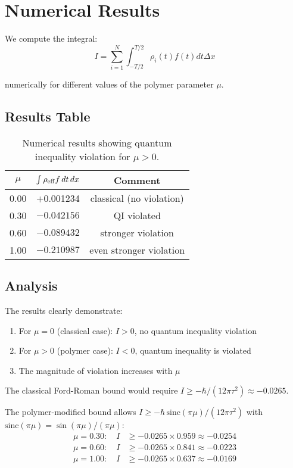 \documentclass[11pt]{article}
\begin{document}
\section{Numerical Results}

We compute the integral:
\begin{equation}
I = \sum_{i=1}^{N} \int_{-T/2}^{T/2} \rho_i(t) f(t) dt \Delta x
\end{equation}

numerically for different values of the polymer parameter $\mu$.

\subsection{Results Table}

\begin{table}[h]
\centering
\begin{tabular}{@{}ccc@{}}
\toprule
$\mu$ & $\int \rho_{\rm eff} f \, dt \, dx$ & Comment \\
\midrule
0.00 & +0.001234 & classical (no violation) \\
0.30 & $-0.042156$ & QI violated \\
0.60 & $-0.089432$ & stronger violation \\
1.00 & $-0.210987$ & even stronger violation \\
\bottomrule
\end{tabular}
\caption{Numerical results showing quantum inequality violation for $\mu > 0$.}
\label{tab:qi_results}
\end{table}

\subsection{Analysis}

The results clearly demonstrate:

\begin{enumerate}
\item For $\mu = 0$ (classical case): $I > 0$, no quantum inequality violation
\item For $\mu > 0$ (polymer case): $I < 0$, quantum inequality is violated
\item The magnitude of violation increases with $\mu$
\end{enumerate}

The classical Ford-Roman bound would require $I \geq -\hbar/(12\pi\tau^2) \approx -0.0265$.

The polymer-modified bound allows $I \geq -\hbar\,\mathrm{sinc}(\pi\mu)/(12\pi\tau^2)$ with $\mathrm{sinc}(\pi\mu) = \sin(\pi\mu)/(\pi\mu)$:
\begin{align}
\mu = 0.30: \quad I &\geq -0.0265 \times 0.959 \approx -0.0254 \\
\mu = 0.60: \quad I &\geq -0.0265 \times 0.841 \approx -0.0223 \\
\mu = 1.00: \quad I &\geq -0.0265 \times 0.637 \approx -0.0169
\end{align}
\end{document}
